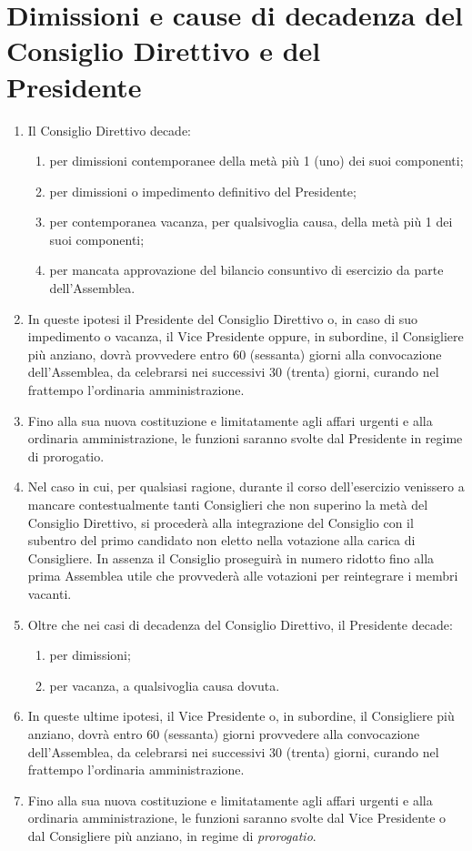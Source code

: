 \documentclass{djtsdoc}
\begin{document}
	\section{Dimissioni e cause di decadenza del Consiglio Direttivo e del Presidente}
	\begin{enumerate}
		\item Il Consiglio Direttivo decade:
		\begin{enumerate}
			\item per dimissioni contemporanee della metà più 1 (uno) dei suoi componenti;
			\item per dimissioni o impedimento definitivo del Presidente;
			\item per contemporanea vacanza, per qualsivoglia causa, della metà più 1 dei suoi componenti;
			\item per mancata approvazione del bilancio consuntivo di esercizio da parte dell'Assemblea.
		\end{enumerate}
		\item In queste ipotesi il Presidente del Consiglio Direttivo o, in caso di suo impedimento o vacanza, il Vice Presidente oppure, in subordine, il Consigliere più anziano, dovrà provvedere entro 60 (sessanta) giorni alla convocazione dell'Assemblea, da celebrarsi nei successivi 30 (trenta) giorni, curando nel frattempo l'ordinaria amministrazione.
		\item Fino alla sua nuova costituzione e limitatamente agli affari urgenti e alla ordinaria amministrazione, le funzioni saranno svolte dal Presidente in regime di prorogatio.
		\item Nel caso in cui, per qualsiasi ragione, durante il corso dell'esercizio venissero a mancare contestualmente tanti Consiglieri che non superino la metà del Consiglio Direttivo, si procederà alla  integrazione del Consiglio con il subentro del primo candidato non eletto nella votazione alla carica di Consigliere. In assenza il  Consiglio proseguirà in numero ridotto fino alla prima Assemblea utile che provvederà alle votazioni per reintegrare i membri vacanti.
		\item Oltre che nei casi di decadenza del Consiglio Direttivo, il Presidente decade:
		\begin{enumerate}
			\item per dimissioni;
			\item per vacanza, a qualsivoglia causa dovuta.
		\end{enumerate}
		\item In queste ultime ipotesi, il Vice Presidente o, in subordine, il Consigliere più anziano, dovrà entro 60 (sessanta) giorni provvedere alla convocazione dell'Assemblea, da celebrarsi nei successivi 30 (trenta) giorni, curando nel frattempo l'ordinaria amministrazione.
		\item Fino alla sua nuova costituzione e limitatamente agli affari urgenti e alla ordinaria amministrazione, le funzioni saranno svolte dal Vice Presidente o dal Consigliere più anziano, in regime di \textit{prorogatio}.
	\end{enumerate}
	
\end{document}
